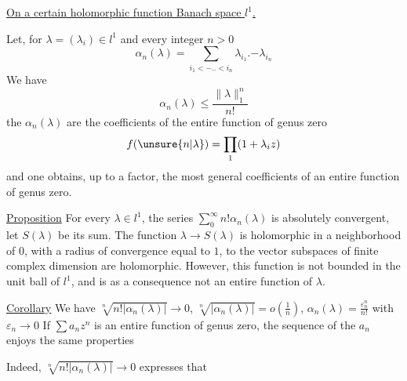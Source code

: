 \uline{On a certain holomorphic function  Banach space $l^1$.}

Let, for $\lambda=(\lambda_i)\in l^1$ and every integer $n>0$
\[
\alpha_n(\lambda)=\sum_{i_1<\mathord{-}\mathord{.}\mathord{.}<i_n}\lambda_{i_1}\mathord{.}\mathord{-}\lambda_{i_n}
\]
We have
\[
\alpha_n(\lambda)\leq\frac{\|\lambda\|_1^n}{n!}
\]
the $\alpha_n(\lambda)$ are the coefficients of the entire function
of genus zero
\[
f(\unsure{n|\lambda})=\prod_1(1+\lambda_i z)
\]
and one obtains, up to a  factor, the
most general coefficients of an entire function
of genus zero.

\uline{Proposition} For every $\lambda\in l^1$, the series $\sum_0^\infty n!\alpha_n(\lambda)$
is absolutely convergent, let $S(\lambda)$ be its sum.
The function $\lambda\to S(\lambda)$ is holomorphic in a neighborhood
of $0$, with a radius of convergence equal to $1$,
  to the vector subspaces
of finite complex dimension are holomorphic.
However,  this function is not bounded
in the unit ball of $l^1$, and is as a
consequence not an entire function of $\lambda$.

\uline{Corollary} We have  $\sqrt[n]{n!|\alpha_n(\lambda)|}\to 0$,
$\sqrt[n]{|\alpha_n(\lambda)|}=o\left(\frac{1}{n}\right)$, $\alpha_n(\lambda)=\frac{\varepsilon_n^n}{n!}$ with $\varepsilon_n\to 0$
If $\sum a_nz^n$ is an entire function of
genus zero, the sequence of the $a_n$ enjoys
the same properties

Indeed, $\sqrt[n]{n!|\alpha_n(\lambda)|}\to 0$ expresses that
